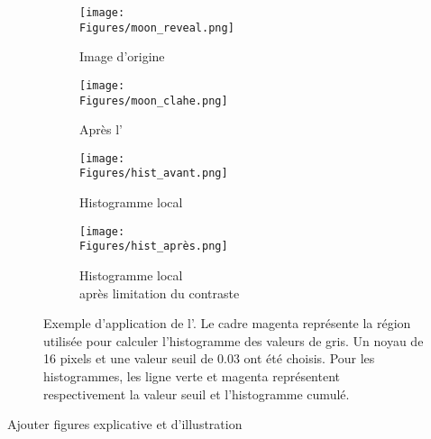 \documentclass[\main/main.tex]{subfiles}
\begin{document}
\begin{figure}[h]
    \centering
    \begin{subfigure}[b]{0.45\textwidth}
       \caption{
       Image d'origine
            }
       \centering \texttt{[image: \\Figures/moon\_reveal.png]}
    \end{subfigure}
    \begin{subfigure}[b]{0.45\textwidth}
       \caption{
       Après l'\clahe
            }
       \centering \texttt{[image: \\Figures/moon\_clahe.png]}
    \end{subfigure}
    \begin{subfigure}[b]{0.45\textwidth}
       \caption{
       Histogramme local
            }
       \centering \texttt{[image: \\Figures/hist\_avant.png]}
    \end{subfigure}
    \begin{subfigure}[b]{0.45\textwidth}
       \caption{
       \centering
       Histogramme local \\après limitation du contraste
            }
       \centering \texttt{[image: \\Figures/hist\_après.png]}
    \end{subfigure}
    \caption{
        \label{fig:clahe}
        Exemple d'application de l'\clahe{}.
        Le cadre magenta représente la région utilisée pour calculer l'histogramme des valeurs de gris.
        Un noyau de 16 pixels et une valeur seuil de 0.03 ont été choisis.
        Pour les histogrammes, les ligne verte et  magenta représentent respectivement la valeur seuil et l'histogramme cumulé. 
    }
\end{figure}


\color{magenta}Ajouter figures explicative et d'illustration\color{black}
\end{document}
